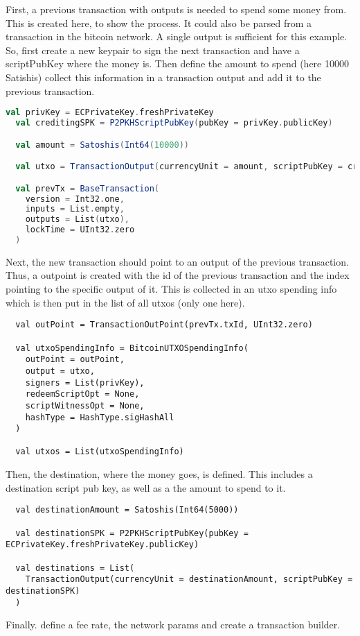 First, a previous transaction with outputs is needed to spend some money from.
This is created here, to show the process.
It could also be parsed from a transaction in the bitcoin network.
A single output is sufficient for this example.
So, first create a new keypair to sign the next transaction and have a scriptPubKey where the money is.
Then define the amount to spend (here 10000 Satishis) collect this information in a transaction output and add it to the previous transaction.
\begin{lstlisting}[language=scala]
  val privKey = ECPrivateKey.freshPrivateKey
  val creditingSPK = P2PKHScriptPubKey(pubKey = privKey.publicKey)

  val amount = Satoshis(Int64(10000))

  val utxo = TransactionOutput(currencyUnit = amount, scriptPubKey = creditingSPK)

  val prevTx = BaseTransaction(
    version = Int32.one,
    inputs = List.empty,
    outputs = List(utxo),
    lockTime = UInt32.zero
  )
\end{lstlisting}
Next, the new transaction should point to an output of the previous transaction.
Thus, a outpoint is created with the id of the previous transaction and the index pointing to the specific output of it.
This is collected in an utxo spending info which is then put in the list of all utxos (only one here).
\begin{lstlisting}  
  val outPoint = TransactionOutPoint(prevTx.txId, UInt32.zero)

  val utxoSpendingInfo = BitcoinUTXOSpendingInfo(
    outPoint = outPoint,
    output = utxo,
    signers = List(privKey),
    redeemScriptOpt = None,
    scriptWitnessOpt = None,
    hashType = HashType.sigHashAll
  )

  val utxos = List(utxoSpendingInfo)
\end{lstlisting}
Then, the destination, where the money goes, is defined.
This includes a destination script pub key, as well as a the amount to spend to it.
\begin{lstlisting}
  val destinationAmount = Satoshis(Int64(5000))

  val destinationSPK = P2PKHScriptPubKey(pubKey = ECPrivateKey.freshPrivateKey.publicKey)

  val destinations = List(
    TransactionOutput(currencyUnit = destinationAmount, scriptPubKey = destinationSPK)
  )
\end{lstlisting}
Finally. define a fee rate, the network params and create a transaction builder.
